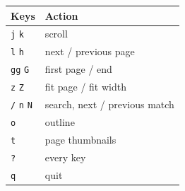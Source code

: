 \documentclass[12pt]{article}
\begin{document}
\begin{center}
  \begin{tabular}{ll}
    \toprule
    Keys & Action \\
    \midrule
    \texttt{j} \texttt{k} & scroll \\
    \texttt{l} \texttt{h} & next / previous page \\
    \texttt{gg} \texttt{G} & first page / end \\
    \texttt{z} \texttt{Z} & fit page / fit width \\
    \texttt{/} \texttt{n} \texttt{N} & search, next / previous match \\
    \texttt{o} & outline \\
    \texttt{t} & page thumbnails \\
    \texttt{?} & every key \\
    \texttt{q} & quit \\
    \bottomrule
  \end{tabular}
\end{center}
\end{document}
